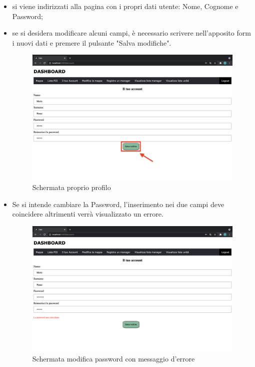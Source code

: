 \begin{itemize}
    \item si viene indirizzati alla pagina con i propri dati utente: Nome, Cognome e Password;
    \item se si desidera modificare alcuni campi, è necessario scrivere nell'apposito form i nuovi dati e premere il pulsante "Salva modifiche".
    \begin{figure}[H]
        \centering
        \includegraphics[scale=0.12]{res/images/account_user.png}
        \caption{Schermata proprio profilo}
    \end{figure}
    \item Se si intende cambiare la Password, l'inserimento nei due campi deve coincidere altrimenti verrà visualizzato un errore.
    \begin{figure}[H]
        \centering
        \includegraphics[scale=0.12]{res/images/account_errore.png}
        \caption{Schermata modifica
        password con messaggio d'errore}
    \end{figure}
\end{itemize}



